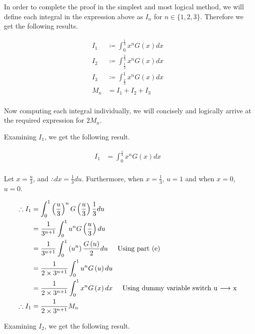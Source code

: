 \documentclass[a4paper]{article}
\begin{document}
\begin{enumerate}[label=\textbf{\arabic*.}]
\begin{enumerate}
		\pagebreak

		In order to complete the proof in the simplest and most logical method, we will define each integral in the expression above as $I_n$ for $n \in \{1,2,3\}$. Therefore we get the following results.

		\begin{align*}
		I_1 & \coloneqq \int_{0}^{\frac{1}{3}}x^{n}G(x)dx\\
		I_2 & \coloneqq \int_{\frac{1}{3}}^{\frac{2}{3}}x^{n}G(x)dx\\
		I_3 & \coloneqq \int_{\frac{2}{3}}^{1}x^{n}G(x)dx\\
		M_n & = I_1 + I_2 + I_3\\
		\end{align*}

		Now computing each integral individually, we will concisely and logically arrive at the required expression for $2M_n$.

		\bigbreak

		Examining $I_1$, we get the following result.

		\begin{align*}
		I_1 & = \int_{0}^{\frac{1}{3}}x^{n}G(x)dx\\
		\end{align*}

		Let $x = \frac{u}{3}$, and $\therefore dx = \frac{1}{3}du$. Furthermore, when $x = \frac{1}{3}$, $u = 1$ and when $x = 0$, $u = 0$.

		\begin{align*}
		\therefore I_1 & = \int_{0}^{1}\left(\frac{u}{3}\right)^{n}G\left(\frac{u}{3}\right)\frac{1}{3}du\\
		& = \frac{1}{3^{n+1}}\int_{0}^{1}u^{n}G\left(\frac{u}{3}\right)du\\
		& = \frac{1}{3^{n+1}}\int_{0}^{1}\left(u^{n}\right)\frac{G\left(u\right)}{2}du \hspace{5mm} \text{Using part (e)}\\
		& = \frac{1}{2\times3^{n+1}}\int_{0}^{1}u^{n}G\left(u\right)du\\
		& = \frac{1}{2\times3^{n+1}}\int_{0}^{1}x^{n}G\left(x\right)dx \hspace{5mm} \text{Using dummy variable switch u $\longrightarrow$ x}\\
		\therefore I_1 & = \frac{1}{2\times3^{n+1}}M_n\\
		\end{align*}

		Examining $I_2$, we get the following result.


\end{enumerate}
\end{enumerate}
\end{document}
